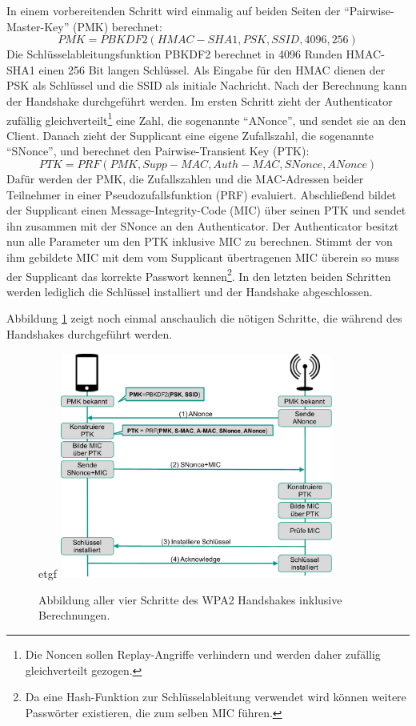 In einem vorbereitenden Schritt wird einmalig auf beiden Seiten der \enquote{Pairwise-Master-Key} (PMK) berechnet:
\[PMK = PBKDF2(HMAC-SHA1, PSK, SSID, 4096, 256)\]
Die Schlüsselableitungsfunktion PBKDF2  berechnet in 4096 Runden HMAC-SHA1 einen 256 Bit langen Schlüssel.
Als Eingabe für den HMAC dienen der PSK als Schlüssel und die SSID als initiale Nachricht.
Nach der Berechnung kann der Handshake durchgeführt werden.
Im ersten Schritt zieht der Authenticator zufällig gleichverteilt\footnote{Die Noncen sollen Replay-Angriffe verhindern und werden daher zufällig gleichverteilt gezogen.} eine Zahl, die sogenannte \enquote{ANonce}, und sendet sie an den Client.
Danach zieht der Supplicant eine eigene Zufallszahl, die sogenannte \enquote{SNonce}, und berechnet den Pairwise-Transient Key (PTK):
\[PTK = PRF(PMK, Supp-MAC, Auth-MAC, SNonce, ANonce)\]
Dafür werden der PMK, die Zufallszahlen und die MAC-Adressen beider Teilnehmer in einer Pseudozufallsfunktion (PRF) evaluiert.
Abschließend bildet der Supplicant einen Message-Integrity-Code (MIC) über seinen PTK und sendet ihn zusammen mit der SNonce an den Authenticator.
Der Authenticator besitzt nun alle Parameter um den PTK inklusive MIC zu berechnen.
Stimmt der von ihm gebildete MIC mit dem vom Supplicant übertragenen MIC überein so muss der Supplicant das korrekte Passwort kennen\footnote{Da eine Hash-Funktion zur Schlüsselableitung verwendet wird können weitere Passwörter existieren, die zum selben MIC führen.}.
In den letzten beiden Schritten werden lediglich die Schlüssel installiert und der Handshake abgeschlossen.

Abbildung \ref{fig:wpa2handshake} zeigt noch einmal anschaulich die nötigen Schritte, die während des Handshakes durchgeführt werden.
\begin{figure}[ht]
	\centering
etgf	\includegraphics[width=0.80\textwidth]{graphics/wpa2handshake}
	\caption[Deauthentication-Frame]{Abbildung aller vier Schritte des WPA2 Handshakes inklusive Berechnungen.}
	\label{fig:wpa2handshake}
\end{figure}

\FloatBarrier